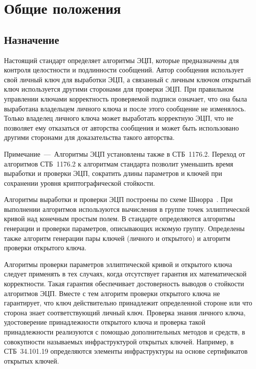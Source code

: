\chapter{Общие положения}\label{COMMON}

\section{Назначение}\label{COMMON.Dest}

Настоящий стандарт определяет алгоритмы ЭЦП,
которые предназначены для контроля целостности и подлинности сообщений. 
%
Автор сообщения использует свой личный ключ для выработки ЭЦП, 
а связанный с личным ключом открытый ключ используется 
другими сторонами для проверки ЭЦП.
%
При правильном управлении ключами
корректность проверяемой подписи означает, 
что она была выработана владельцем личного ключа и после этого
сообщение не изменялось.
%
Только владелец личного ключа может выработать корректную 
ЭЦП, что не позволяет ему отказаться от авторства сообщения 
и может быть использовано другими сторонами для 
доказательства такого авторства.

\begin{note}
Примечание~---~Алгоритмы ЭЦП установлены также в СТБ~1176.2. 
Переход от алгоритмов СТБ~1176.2 к алгоритмам стандарта 
позволит уменьшить время выработки и проверки ЭЦП,
сократить длины параметров и ключей при сохранении 
уровня криптографической стойкости.
\end{note}

Алгоритмы выработки и проверки ЭЦП 
построены по схеме Шнорра~\cite{Schnorr}.
%
При выполнении алгоритмов используются 
вычисления в группе точек эллиптической кривой
над конечным простым полем.
%
В стандарте определяются алгоритмы генерации 
и проверки параметров, описывающих искомую группу.
%
Определены также алгоритм генерации пары ключей (личного и открытого) 
и алгоритм проверки открытого ключа.

Алгоритмы проверки параметров эллиптической кривой и открытого
ключа следует применять в тех случаях, 
когда отсутствует гарантия их математической корректности.
%
%
Такая гарантия обеспечивает достоверность выводов о стойкости алгоритмов ЭЦП.
%
Вместе с тем
алгоритм проверки открытого ключа не гарантирует, 
что ключ действительно принадлежит определенной стороне
или что сторона знает соответствующий личный ключ.
%
Проверка знания личного ключа, 
удостоверение принадлежности открытого ключа 
и проверка такой принадлежности
реализуются с помощью дополнительных методов и средств, 
в совокупности называемых инфраструктурой открытых ключей.
%
Например, в СТБ~34.101.19 определяются элементы инфраструктуры 
на основе сертификатов открытых ключей.

